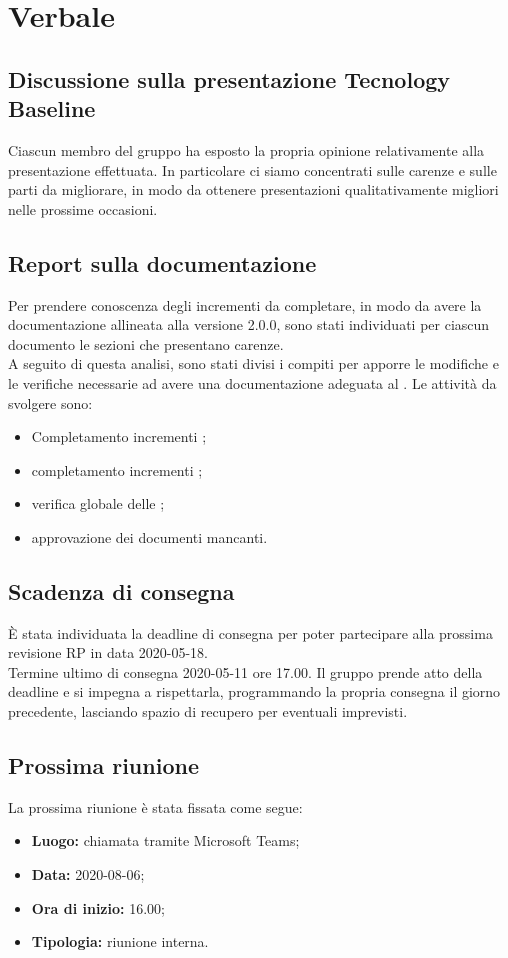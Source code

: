 \section{Verbale}

	\subsection{Discussione sulla presentazione Tecnology Baseline}
		Ciascun membro del gruppo ha esposto la propria opinione relativamente alla presentazione effettuata. In particolare ci siamo concentrati sulle carenze e sulle parti da migliorare, in modo da ottenere presentazioni qualitativamente migliori nelle prossime occasioni.
	
	
	\subsection{Report sulla documentazione}
		Per prendere conoscenza degli incrementi da completare, in modo da avere la documentazione allineata alla versione 2.0.0, sono stati individuati per ciascun documento le sezioni che presentano carenze.\\
		A seguito di questa analisi, sono stati divisi i compiti per apporre le modifiche e le verifiche necessarie ad avere una documentazione adeguata al \PdQ{}. Le attività da svolgere sono:
		\begin{itemize}
			\item Completamento incrementi \PdP;
			\item completamento incrementi \PdQ;
			\item verifica globale delle \NdP;
			\item approvazione dei documenti mancanti.		
		\end{itemize}
	
	
	\subsection{Scadenza di consegna}
		È stata individuata la deadline di consegna per poter partecipare alla prossima revisione RP in data 2020-05-18.\\
		Termine ultimo di consegna 2020-05-11 ore 17.00. Il gruppo prende atto della deadline e si impegna a rispettarla, programmando la propria consegna il giorno precedente, lasciando spazio di recupero per eventuali imprevisti.
		
		
	\subsection{Prossima riunione}
		La prossima riunione è stata fissata come segue:
		\begin{itemize}
			\item \textbf{Luogo: } chiamata tramite Microsoft Teams; 
			\item \textbf{Data: } 2020-08-06;
			\item \textbf{Ora di inizio: } 16.00;
			\item \textbf{Tipologia: } riunione interna.
		\end{itemize}